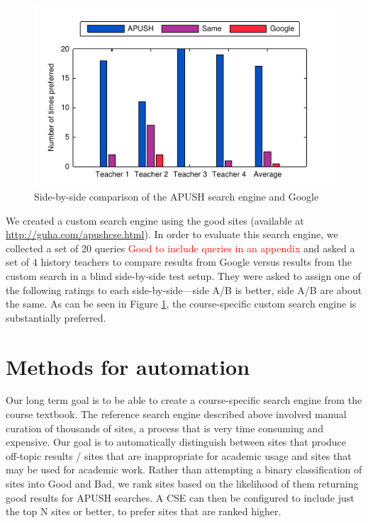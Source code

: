 \documentclass{acm_proc_article-sp}
\begin{document}
\begin{figure}
\includegraphics{teacher_eval}
\caption{Side-by-side comparison of the APUSH search engine and Google}
\label{fig-eval}
\end{figure}

We created a custom search engine using the good sites (available at
\url{http://guha.com/apushcse.html}). In order to evaluate this search engine,
we collected a set of 20 queries \textcolor{red}{Good to include queries in an
  appendix} and asked a set of 4 history teachers to
compare results from Google versus results from the custom search in a blind
side-by-side test setup. They were asked to assign one of the following ratings
to each side-by-side---side A/B is better, side A/B are about the same. As can
be seen in Figure \ref{fig-eval}, the course-specific custom search engine is
substantially preferred.

\section{Methods for automation}

Our long term goal is to be able to create a course-specific search engine from
the course textbook. The reference search engine described above involved manual
curation of thousands of sites, a process that is very time consuming and
expensive. Our goal is to automatically distinguish between sites that produce
off-topic results / sites that are inappropriate for academic usage and sites
that may be used for academic work.  Rather than attempting a binary
classification of sites into Good and Bad, we rank sites based on the likelihood
of them returning good results for APUSH searches. A CSE can then be configured
to include just the top N sites or better, to prefer sites that are ranked
higher. 
\end{document}
